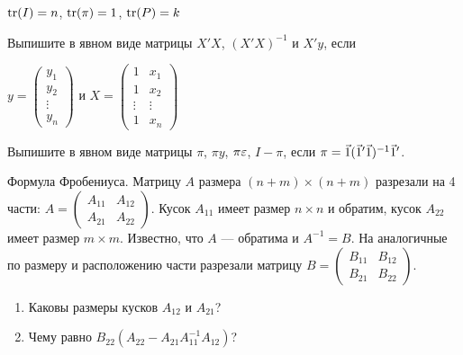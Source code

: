 \documentclass[pdftex,11pt,openany]{book}\usepackage[]{graphicx}\usepackage[]{color}
\begin{document}
\begin{solution}
$\operatorname{tr}(I)=n$, $\operatorname{tr}(\pi)=1$, $\operatorname{tr}(P)=k$ 
\end{solution}


\begin{problem}
Выпишите в явном виде матрицы $X'X$, $(X'X)^{-1}$ и $X'y$, если

$y=\left(
\begin{array}{c}
y_1 \\
y_2 \\
\vdots \\
y_n 
\end{array}\right)$ и
$X=\left(
\begin{array}{cc}
1 & x_1 \\
1 & x_2 \\
\vdots & \vdots \\
1 & x_n 
\end{array}\right)$ 
\end{problem}

\begin{solution}
\end{solution}


\begin{problem}
Выпишите в явном виде матрицы $\pi$, $\pi y$, $\pi \varepsilon$, $I-\pi$, если $\pi=\v1(\v1'\v1)^{-1}\v1'$.
\end{problem}

\begin{solution}
\end{solution}


\begin{problem}
Формула Фробениуса. Матрицу $A$ размера $(n+m)\times (n+m)$ разрезали на 4 части: $A=\begin{pmatrix}
A_{11} & A_{12} \\
A_{21} & A_{22} 
\end{pmatrix}$. Кусок $A_{11}$ имеет размер $n\times n$ и обратим, кусок $A_{22}$ имеет размер $m\times m$. Известно, что $A$ --- обратима и $A^{-1}=B$. На аналогичные по размеру и расположению части разрезали матрицу $B=\begin{pmatrix}
B_{11} & B_{12} \\
B_{21} & B_{22} 
\end{pmatrix}$.
\begin{enumerate}
\item Каковы размеры кусков $A_{12}$ и $A_{21}$?
\item Чему равно $B_{22}(A_{22}-A_{21}A_{11}^{-1}A_{12})$?
\end{enumerate}
\end{problem}
\end{document}
